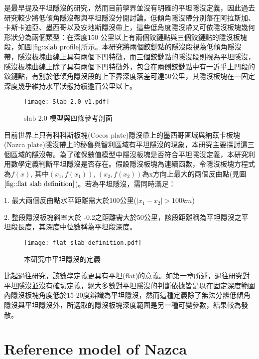 \citealp{barazangi1976}是最早提及平坦隱沒的研究，然而目前學界並沒有明確的平坦隱沒定義，因此過去研究較少將低傾角隱沒帶與平坦隱沒分開討論。低傾角隱沒帶分別落在阿拉斯加、卡斯卡迪亞、墨西哥以及安地斯隱沒帶上，這些低角度隱沒帶又可依隱沒板塊幾何形狀分為兩個類型：在深度150 公里以上有兩個鉸鏈點與三個鉸鏈點的隱沒板塊段，如圖$\ref{fig::slab profile}$所示。本研究將兩個鉸鏈點的隱沒段視為低傾角隱沒帶，隱沒板塊曲線上具有兩個下凹特徵，而三個鉸鏈點的隱沒段則視為平坦隱沒，隱沒板塊曲線上除了具有兩個下凹特徵外，包含在兩側鉸鏈點中有一近乎上凹段的鉸鏈點，有別於低傾角隱沒段的上下界深度落差可達50公里，其隱沒板塊在一固定深度幾乎維持水平狀態持續逾百公里以上。

\begin{figure*}[ht!]
    \centering
    \texttt{[image: Slab\_2.0\_v1.pdf]}
    \caption{slab 2.0 模型與四條參考剖面}
    \label{fig::slab profile}
\end{figure*}

目前世界上只有科科斯板塊(Cocos plate)隱沒帶上的墨西哥區域與納茲卡板塊(Nazca plate)隱沒帶上的秘魯與智利區域有平坦隱沒的現象，本研究主要探討這三個區域的隱沒帶。為了確保數值模型中隱沒板塊是否符合平坦隱沒定義，本研究利用數學定義判斷平坦隱沒是否存在。假設隱沒板塊為連續函數，令隱沒板塊方程式為$f(x)$, 其中$(x_{1},f(x_{1}))$, $(x_{2},f(x_{2}))$為x方向上最大的兩個反曲點(見圖$\ref{fig::flat slab definition}$)。若為平坦隱沒，需同時滿足：

1. 最大兩個反曲點水平距離需大於100公里($\mid x_{1}-x_{2}\mid > 100 km$)

2. 整段隱沒板塊斜率大於 -0.2之距離需大於50公里，該段距離稱為平坦隱沒之平坦段長度，其深度中位數稱為平坦段深度。

\begin{figure*}[ht!]
    \centering
    \texttt{[image: flat\_slab\_definition.pdf]}
    \caption{本研究中平坦隱沒的定義}
    \label{fig::flat slab definition}
\end{figure*}


比起過往研究，該數學定義更具有平坦(flat)的意義。如第一章所述，過往研究對平坦隱沒並沒有確切定義，絕大多數對平坦隱沒的判斷依據皆是以在固定深度範圍內隱沒板塊角度低於15-20度辨識為平坦隱沒，然而這種定義除了無法分辨低傾角隱沒與平坦隱沒外，所選取的隱沒板塊深度範圍是另一種可變參數，結果較為發散。

\section{Reference model of Nazca}

